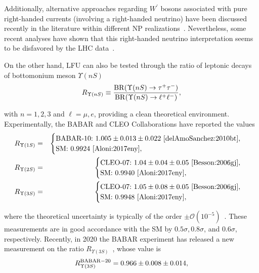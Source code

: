 \documentclass[reprint,showpacs,aps,prd,nofootinbib,superscriptaddress,longbibliography]{revtex4-1}
\begin{document}
Additionally, alternative approaches regarding $W^\prime$ bosons associated with pure right-handed currents (involving a right-handed neutrino) have been discussed recently in the literature within different NP realizations~\cite{Greljo:2018tzh,Gomez:2019xfw,
Iguro:2018fni,Hayreter:2019dzc,He:2012zp,He:2017bft,Carena:2018cow,Babu:2018vrl,Asadi:2018wea,Greljo:2018ogz,Robinson:2018gza, Asadi:2018sym,Azatov:2018kzb,Cvetic:2017gkt}. Nevertheless, some recent analyses have shown that this right-handed neutrino interpretation seems to be disfavored by the LHC data~\cite{Shi:2019gxi,Greljo:2018tzh}.

On the other hand, LFU can also be tested through the ratio of leptonic decays of bottomonium meson $\Upsilon(nS)$~\cite{Aloni:2017eny}
\begin{equation} \label{R_Upsilon}
R_{\Upsilon(nS)} \equiv \frac{{\rm BR}(\Upsilon(nS) \to \tau^+\tau^-)}{{\rm BR}(\Upsilon(nS) \to \ell^+\ell^-)},
\end{equation}

\noindent with $n=1,2,3$ and $\ell=\mu,e$, providing a clean theoretical environment. Experimentally, the BABAR and CLEO Collaborations have reported the values~\cite{delAmoSanchez:2010bt,Besson:2006gj}
\begin{eqnarray}
R_{\Upsilon(1S)} &=&
\begin{cases}
\text{BABAR-10:} \ 1.005 \pm 0.013 \pm 0.022 \text{~\cite{delAmoSanchez:2010bt}}, \\
\text{SM:} \ 0.9924 \text{~\cite{Aloni:2017eny}},
\end{cases} \\
R_{\Upsilon(2S)} &=&
\begin{cases}
\text{CLEO-07:} \ 1.04 \pm 0.04 \pm 0.05 \text{~\cite{Besson:2006gj}}, \\
\text{SM:} \ 0.9940 \text{~\cite{Aloni:2017eny}},
\end{cases} \\
R_{\Upsilon(3S)} &=& 
\begin{cases}
\text{CLEO-07:} \ 1.05 \pm 0.08 \pm 0.05 \text{~\cite{Besson:2006gj}}, \\
\text{SM:} \ 0.9948 \text{~\cite{Aloni:2017eny}},
\end{cases} 
\end{eqnarray} 

\noindent where the theoretical uncertainty is typically of the order $\pm \mathcal{O}(10^{-5})$~\cite{Aloni:2017eny}. These measurements are in good accordance with the SM by $0.5\sigma, 0.8\sigma$, and $0.6\sigma$, respectively. Recently, in 2020 the BABAR experiment has released a new measurement on the ratio $R_{\Upsilon(3S)}$~\cite{Lees:2020kom}, whose value is
\begin{equation}
R_{\Upsilon(3S)}^{\rm BABAR-20} = 0.966 \pm 0.008 \pm 0.014,
\end{equation}
\end{document}
